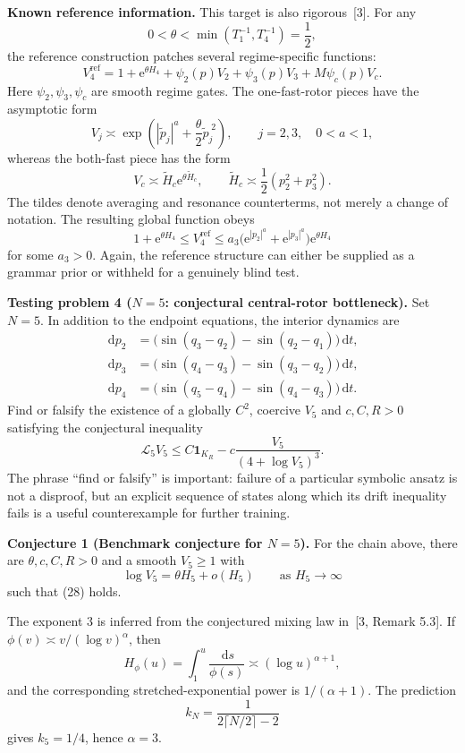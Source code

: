 \documentclass[11pt]{article}
\newcommand{\1}{\mathbf{1}}
\newcommand{\cL}{\mathcal{L}}
\newcommand{\ee}{\mathrm{e}}
\newcommand{\dd}{\,\mathrm{d}}
\newcommand{\wt}[1]{\widetilde{#1}}
\begin{document}
\medskip
\noindent\textbf{Known reference information.}
This target is also rigorous~[3]. For any
\[
0<\theta<\min(T_1^{-1},T_4^{-1})=\frac12,
\]
the reference construction patches several regime-specific functions:
\begin{equation}
V_4^{\mathrm{ref}}=1+\ee^{\theta H_4}+\psi_2(p)V_2+\psi_3(p)V_3+M\psi_c(p)V_c.
\end{equation}
Here $\psi_2,\psi_3,\psi_c$ are smooth regime gates. The one-fast-rotor pieces have the asymptotic form
\[
V_j\asymp\exp\!\left(|\wt p_j|^a+\frac\theta2\wt p_j^{\;2}\right),
\qquad j=2,3,\quad 0<a<1,
\]
whereas the both-fast piece has the form
\[
V_c\asymp\wt H_c\ee^{\theta\wt H_c},
\qquad
\wt H_c\asymp\frac12(p_2^2+p_3^2).
\]
The tildes denote averaging and resonance counterterms, not merely a change of notation. The resulting global function obeys
\begin{equation}
1+\ee^{\theta H_4}\le V_4^{\mathrm{ref}}
\le a_3\bigl(\ee^{|p_2|^a}+\ee^{|p_3|^a}\bigr)\ee^{\theta H_4}
\end{equation}
for some $a_3>0$. Again, the reference structure can either be supplied as a grammar prior or withheld for a genuinely blind test.

\medskip
\noindent\textbf{Testing problem 4 ($N=5$: conjectural central-rotor bottleneck).}
Set $N=5$. In addition to the endpoint equations, the interior dynamics are
\begin{align*}
\dd p_2&=\bigl(\sin(q_3-q_2)-\sin(q_2-q_1)\bigr)\dd t,\\
\dd p_3&=\bigl(\sin(q_4-q_3)-\sin(q_3-q_2)\bigr)\dd t,\\
\dd p_4&=\bigl(\sin(q_5-q_4)-\sin(q_4-q_3)\bigr)\dd t.
\end{align*}
Find or falsify the existence of a globally $C^2$, coercive $V_5$ and $c,C,R>0$ satisfying the conjectural inequality
\begin{equation}
\cL_5V_5\le C\1_{K_R}-c\frac{V_5}{(4+\log V_5)^3}.
\end{equation}
The phrase ``find or falsify'' is important: failure of a particular symbolic ansatz is not a disproof, but an explicit sequence of states along which its drift inequality fails is a useful counterexample for further training.

\medskip
\noindent\textbf{Conjecture 1 (Benchmark conjecture for $N=5$).}
For the chain above, there are $\theta,c,C,R>0$ and a smooth $V_5\ge1$ with
\[
\log V_5=\theta H_5+o(H_5)\qquad\text{as }H_5\to\infty
\]
such that (28) holds.

The exponent $3$ is inferred from the conjectured mixing law in~[3, Remark 5.3]. If $\phi(v)\asymp v/(\log v)^\alpha$, then
\[
H_\phi(u)=\int_1^u\frac{\dd s}{\phi(s)}\asymp(\log u)^{\alpha+1},
\]
and the corresponding stretched-exponential power is $1/(\alpha+1)$. The prediction
\[
k_N=\frac1{2\lceil N/2\rceil-2}
\]
gives $k_5=1/4$, hence $\alpha=3$.
\end{document}
